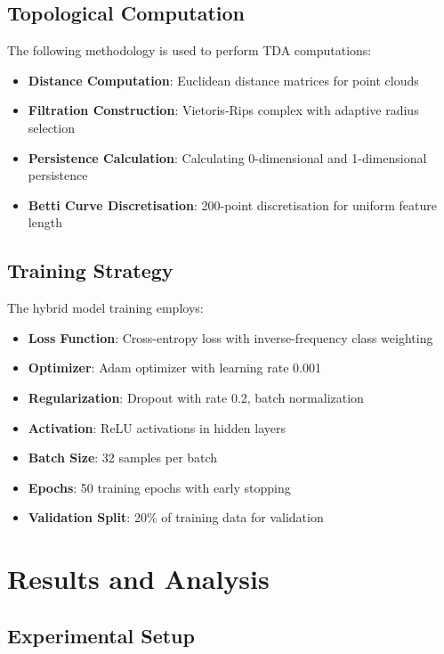 \documentclass[conference]{IEEEtran}
\begin{document}
\subsection{Topological Computation}

The following methodology is used to perform TDA computations:

\begin{itemize}
\item \textbf{Distance Computation}: Euclidean distance matrices for point clouds
\item \textbf{Filtration Construction}: Vietoris-Rips complex with adaptive radius selection
\item \textbf{Persistence Calculation}: Calculating 0-dimensional and 1-dimensional persistence
\item \textbf{Betti Curve Discretisation}: 200-point discretisation for uniform feature length
\end{itemize}

\subsection{Training Strategy}

The hybrid model training employs:

\begin{itemize}
\item \textbf{Loss Function}: Cross-entropy loss with inverse-frequency class weighting
\item \textbf{Optimizer}: Adam optimizer \cite{ref23} with learning rate 0.001
\item \textbf{Regularization}: Dropout \cite{ref24} with rate 0.2, batch normalization \cite{ref25}
\item \textbf{Activation}: ReLU activations \cite{ref22} in hidden layers
\item \textbf{Batch Size}: 32 samples per batch
\item \textbf{Epochs}: 50 training epochs with early stopping
\item \textbf{Validation Split}: 20\% of training data for validation
\end{itemize}

\section{Results and Analysis}

\subsection{Experimental Setup}
\end{document}
